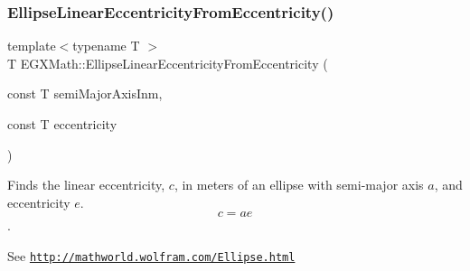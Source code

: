 \mbox{\label{group___e_g_x_math-_geometry-2_d-_ellipse-_linear_eccentricity_gad768e5a198895dd2646b190b7d3208de}} 
\subsubsection{\texorpdfstring{Ellipse\+Linear\+Eccentricity\+From\+Eccentricity()}{EllipseLinearEccentricityFromEccentricity()}}
{\footnotesize\ttfamily template$<$typename T $>$ \\
T E\+G\+X\+Math\+::\+Ellipse\+Linear\+Eccentricity\+From\+Eccentricity (\begin{DoxyParamCaption}\item[{const T}]{semi\+Major\+Axis\+Inm,  }\item[{const T}]{eccentricity }\end{DoxyParamCaption})}



Finds the linear eccentricity, $c$, in meters of an ellipse with semi-\/major axis $a$, and eccentricity $e$. \[ c=a e \]. 

See \href{http://mathworld.wolfram.com/Ellipse.html}{\tt http\+://mathworld.\+wolfram.\+com/\+Ellipse.\+html}


